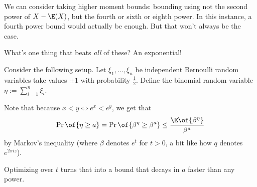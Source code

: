 We can consider taking higher moment bounds: bounding using not the second power of $X - \E(X)$, but the fourth or sixth or eighth power. In this instance, a fourth power bound would actually be enough. But that won't always be the case.

What's one thing that beats \textit{all} of these? An exponential!

Consider the following setup. Let $\xi_1, \ldots, \xi_n$ be independent Bernoulli random variables take values $\pm 1$ with probability $\frac{1}{2}$. Define the binomial random variable $\eta := \sum_{i=1}^{n} \xi_i$.

Note that because $x < y \iff e^x < e^y$, we get that
\begin{align*}
    \Pr\of{\eta \geq a} = \Pr\of{\beta^{\eta} \geq \beta^a} \leq \frac{\E\of{\beta^{\eta}}}{\beta^a}
\end{align*}
by Markov's inequality (where $\beta$ denotes $e^t$ for $t > 0$, a bit like how $q$ denotes $e^{2 \pi i z}$).

Optimizing over $t$ turns that into a bound that decays in $a$ faster than any power.

